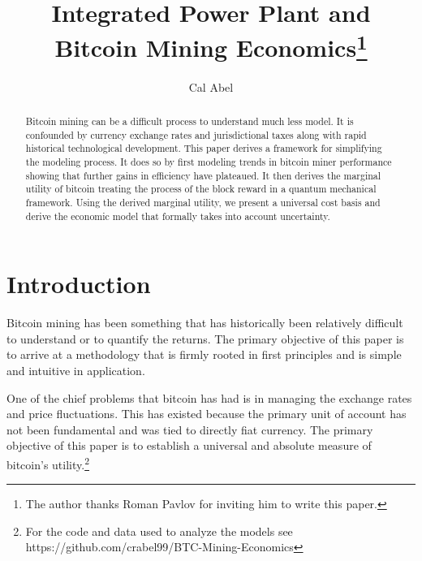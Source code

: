 \documentclass[runningheads]{llncs}
\begin{document}
%
\title{Integrated Power Plant and Bitcoin Mining Economics\thanks{The author thanks Roman Pavlov for inviting him to write this paper.}}
%
%
\author{Cal Abel}
%
%
%
\maketitle
%
\begin{abstract}
    Bitcoin mining can be a difficult process to understand much less model.
    It is confounded by currency exchange rates and jurisdictional taxes along with rapid historical technological development.
    This paper derives a framework for simplifying the modeling process.
    It does so by first modeling trends in bitcoin miner performance showing that further gains in efficiency have plateaued.
    It then derives the marginal utility of bitcoin treating the process of the block reward in a quantum mechanical framework.
    Using the derived marginal utility, we present a universal cost basis and derive the economic model that formally takes into account uncertainty.
\end{abstract}



\section{Introduction}

Bitcoin mining has been something that has historically been relatively difficult to understand or to quantify the returns.
The primary objective of this paper is to arrive at a methodology that is firmly rooted in first principles and is simple and intuitive in application.

One of the chief problems that bitcoin has had is in managing the exchange rates and price fluctuations.
This has existed because the primary unit of account has not been fundamental and was tied to directly fiat currency.
The primary objective of this paper is to establish a universal and absolute measure of bitcoin's utility.\footnote{
    For the code and data used to analyze the models see https://github.com/crabel99/BTC-Mining-Economics
}
\end{document}
